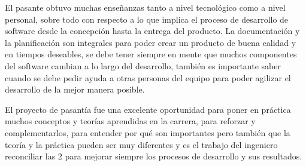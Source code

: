 El pasante obtuvo muchas enseñanzas tanto a nivel tecnológico como a nivel personal, sobre todo con respecto a lo que implica el proceso de desarrollo de software desde la concepción hasta la entrega del producto. La documentación y la planificación son integrales para poder crear un producto de buena calidad y en tiempos deseables, se debe tener siempre en mente que muchos componentes del software cambian a lo largo del desarrollo, también es importante saber cuando se debe pedir ayuda a otras personas del equipo para poder agilizar el desarrollo de la mejor manera posible.

El proyecto de pasantía fue una excelente oportunidad para poner en práctica muchos conceptos y teorías aprendidas en la carrera, para reforzar y complementarlos, para entender por qué son importantes pero también que la teoría y la práctica pueden ser muy diferentes y es el trabajo del ingeniero reconciliar las 2 para mejorar siempre los procesos de desarrollo y sus resultados.